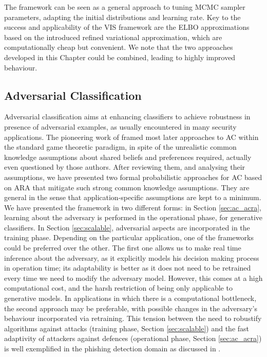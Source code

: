 The framework can be seen as a general 
approach to tuning MCMC sampler parameters, adapting the initial distributions and learning rate. %
Key to the success and applicability of the VIS framework are the ELBO approximations based on the introduced refined variational approximation, which are computationally cheap but convenient. We note that the two approaches developed in this Chapter could be combined, leading to highly improved behaviour.

\subsection{Adversarial Classification}

Adversarial classification aims at enhancing classifiers to achieve robustness in presence of adversarial examples, as usually encountered in many security applications. The pioneering work of \parencite{dalvi2004adversarial} framed most later approaches to AC 
within the standard game theoretic paradigm, in spite of the unrealistic common knowledge assumptions about shared beliefs and preferences required, actually even questioned by those authors. After reviewing them, and analysing  their assumptions, we have presented two formal probabilistic approaches for AC based on ARA that mitigate 
such strong common knowledge assumptions.
They are general in the sense that application-specific assumptions are kept to a minimum. 
%
We have presented the framework in two different forms: in Section \ref{sec:ac_acra}, learning about the adversary is performed in the
operational phase, for generative classifiers. In Section \ref{sec:scalable}, adversarial aspects are incorporated in the training phase. Depending on the particular application, one of the frameworks could be preferred over the other. The first one allows us to make real time inference about the adversary, as it explicitly models his decision making process in operation time; its adaptability is better as it does not need to be retrained every time we need to modify the adversary model. However, this comes at a high computational cost, and the harsh restriction of being only applicable to generative models. In applications in which there is a computational bottleneck, the second approach may be preferable, with possible changes in the adversary's behaviour incorporated via retraining.
This tension between the need to robustify algorithms against attacks (training phase, Section  \ref{sec:scalable}) and the fast adaptivity of attackers against defences (operational phase, Section \ref{sec:ac_acra}) is well exemplified in the phishing detection domain as discussed in \parencite{rakesh}.

